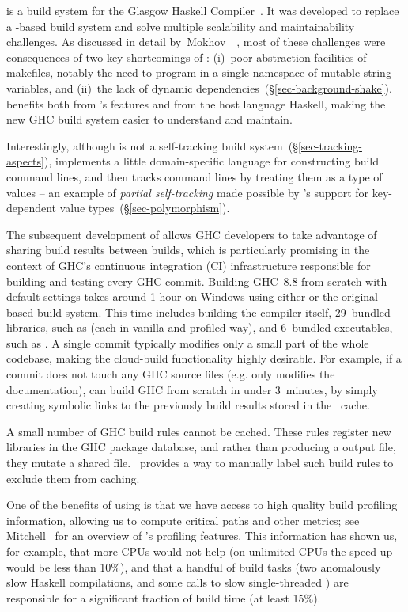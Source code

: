 \Hadrian is a build system for the Glasgow Haskell Compiler~\cite{ghc}. It was
developed to replace a \Make-based build system and solve multiple scalability
and maintainability challenges. As discussed in detail
by~Mokhov~\etal~, most of these challenges were consequences
of two key shortcomings of \Make: (i)~poor abstraction facilities of makefiles,
notably the need to program in a single namespace of mutable string variables, and
(ii)~the lack of dynamic dependencies~(\S\ref{sec-background-shake}).
\Hadrian benefits both from \Shake's features and from the host language
Haskell, making the new GHC build system easier to understand and maintain.

Interestingly, although \Shake is not a self-tracking build
system~(\S\ref{sec-tracking-aspects}), \Hadrian implements a little
domain-specific language for constructing build command lines, and then tracks
command lines by treating them as a type of values -- an example of
\emph{partial self-tracking} made possible by \Shake's support for key-dependent
value types~(\S\ref{sec-polymorphism}).

The subsequent development of \Cloud \Shake allows GHC developers to take advantage of
sharing build results between builds, which is particularly promising in the
context of GHC's continuous integration (CI) infrastructure responsible for
building and testing every GHC commit. Building GHC~8.8 from scratch with
default settings takes around 1 hour on Windows using either \Hadrian or the
original \Make-based build system. This time includes building the compiler itself,
29~bundled libraries, such as  (each in vanilla and profiled way), and
6~bundled executables, such as . A single commit typically modifies
only a small part of the whole codebase, making the cloud-build functionality
highly desirable. For example, if a commit does not touch any GHC source files
(e.g. only modifies the documentation), \Hadrian can build GHC from scratch in under
3~minutes, by simply creating symbolic links to the previously build results
stored in the \Cloud~\Shake cache.

A small number of GHC build rules cannot be cached. These rules register new libraries
in the GHC package database, and rather than producing a output file, they mutate
a shared file. \Cloud~\Shake provides a way to manually label such
build rules to exclude them from caching.

One of the benefits of using \Shake is that we have access to high quality build
profiling information, allowing us to compute critical paths and other metrics;
see Mitchell~ for an overview of \Shake's
profiling features. This information has shown us, for example, that more CPUs would not help (on
unlimited CPUs the speed up would be less than 10\%), and that a handful of
build tasks (two anomalously slow Haskell compilations, and some calls to slow
single-threaded ) are responsible for a significant fraction of
build time (at least 15\%).

